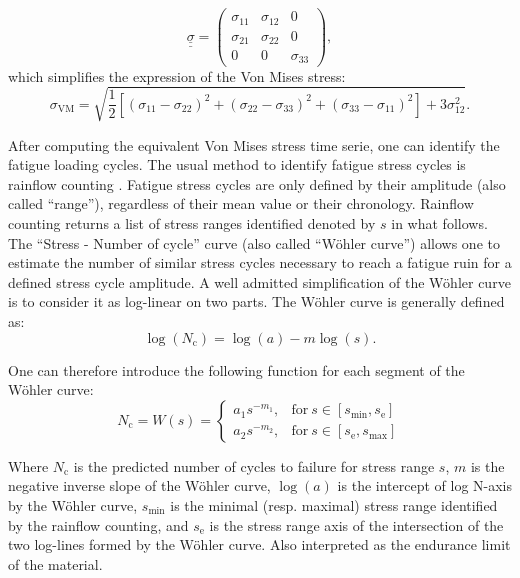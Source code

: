 \begin{equation}
    \underline{\underline{\sigma}} = \begin{pmatrix}
                            \sigma_{11} & \sigma_{12} & 0\\
                            \sigma_{21} & \sigma_{22} & 0\\
                            0 & 0 & \sigma_{33}
                            \end{pmatrix},
\end{equation}
which simplifies the expression of the Von Mises stress:
\begin{equation}
    \sigma _{\mathrm{VM}}=\sqrt{{\frac {1}{2}}\left[(\sigma _{11}-\sigma _{22})^{2}+(\sigma _{22}-\sigma _{33})^{2}+(\sigma _{33}-\sigma _{11})^{2}\right] + 3 \sigma _{12}^{2}}.
\end{equation}

After computing the equivalent Von Mises stress time serie, one can identify the fatigue loading cycles. 
The usual method to identify fatigue stress cycles is rainflow counting \citep{dowling_1972}. 
Fatigue stress cycles are only defined by their amplitude (also called ``range''), regardless of their mean value or their chronology. 
Rainflow counting returns a list of stress ranges identified denoted by $s$ in what follows. 
The ``Stress - Number of cycle'' curve (also called ``W\"ohler curve'') allows one to estimate the number of similar stress cycles necessary to reach a fatigue ruin for a defined stress cycle amplitude. 
A well admitted simplification of the W\"ohler curve is to consider it as log-linear on two parts. 
The W\"ohler curve is generally defined as:
\begin{equation}
    \log(N_{\mathrm{c}}) = \log(a) - m \log(s).
\end{equation}

\noindent One can therefore introduce the following function for each segment of the W\"ohler curve: 
\begin{equation*}
N_{\mathrm{c}} = W(s)= \left\{
    \begin{array}{ll}
        a_{1} s^{-m_1}, & \mbox{for}~ s \in [s_{\mathrm{min}}, s_{\mathrm{e}}] \\
        a_{2} s^{-m_2}, & \mbox{for}~ s \in [s_{\mathrm{e}}, s_{\mathrm{max}}]
    \end{array}
\right.
\end{equation*}

Where $N_{\mathrm{c}}$ is the predicted number of cycles to failure for stress range $s$, $m$ is the negative inverse slope of the W\"ohler curve, $\log(a)$ is the intercept of log N-axis by the W\"ohler curve, $s_{\mathrm{min}}$ is the minimal (resp. maximal) stress range identified by the rainflow counting, and $s_{\mathrm{e}}$ is the stress range axis of the intersection of the two log-lines formed by the W\"ohler curve. 
Also interpreted as the endurance limit of the material.

